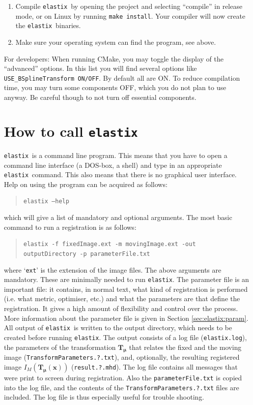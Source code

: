 \documentclass[]{report}
\newcommand{\elastix}{\texttt{elastix}}
\newcommand{\vmu}{\bm{\mu}}
\newcommand{\vT}{\bm{T}}
\newcommand{\vTmx}{\bm{T}_{\vmu}(\bm{x})}
\begin{document}
\begin{enumerate}
\item Compile \elastix\ by opening the project and selecting ``compile'' in
    release mode, or on Linux by running \texttt{make install}. Your
    compiler will now create the \elastix\ binaries.

\item Make sure your operating system can find the program, see
above.
\end{enumerate}

For developers: When running CMake, you may toggle the display of
the ``advanced'' options. In this list you will find several
options like \texttt{USE\_BSplineTransform ON/OFF}. By default all
are ON. To reduce compilation time, you may turn some components
OFF, which you do not plan to use anyway. Be careful though to not
turn off essential components.

\section{How to call \elastix}\label{sec:elastix:call}

\elastix\ is a command line program. This means that you have to
open a command line interface (a DOS-box, a shell) and type in an
appropriate \elastix\ command. This also means that there is no
graphical user interface. Help on using the program can be acquired
as follows:
\begin{quote}
\texttt{elastix --help}
\end{quote}
which will give a list of mandatory and optional arguments. The most
basic command to run a registration is as follows:
\begin{quote}
\texttt{elastix -f fixedImage.ext -m movingImage.ext -out
outputDirectory -p parameterFile.txt}
\end{quote}
where `\texttt{ext}' is the extension of the image files. The above
arguments are mandatory. These are minimally needed to run \elastix.
The parameter file is an important file: it contains, in normal
text, what kind of registration is performed (i.e. what metric,
optimiser, etc.) and what the parameters are that define the
registration. It gives a high amount of flexibility and control over
the process. More information about the parameter file is given in
Section \ref{sec:elastix:param}. All output of \elastix\ is written
to the output directory, which needs to be created before running
\elastix. The output consists of a log file (\texttt{elastix.log}),
the parameters of the transformation $\vT_{\vmu}$ that relates the
fixed and the moving image (\texttt{TransformParameters.?.txt}),
and, optionally, the resulting registered image $I_M(\vTmx)$
(\texttt{result.?.mhd}). The log file contains all messages that
were print to screen during registration. Also the
\texttt{parameterFile.txt} is copied into the log file, and the
contents of the \texttt{TransformParameters.?.txt} files are
included. The log file is thus especially useful for trouble
shooting.
\end{document}

